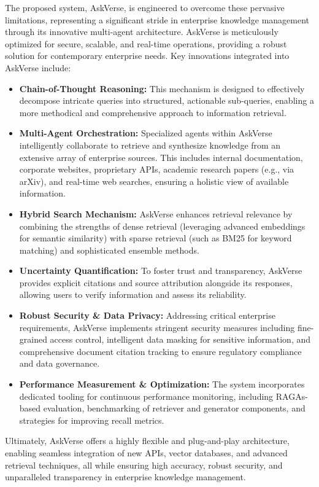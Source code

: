 \documentclass[default]{sn-jnl}%
\begin{document}
The proposed system, AskVerse, is engineered to overcome these pervasive limitations, representing a significant stride in enterprise knowledge management through its innovative multi-agent architecture. AskVerse is meticulously optimized for secure, scalable, and real-time operations, providing a robust solution for contemporary enterprise needs. Key innovations integrated into AskVerse include:
\begin{itemize}
    \item \textbf{Chain-of-Thought Reasoning:} This mechanism is designed to effectively decompose intricate queries into structured, actionable sub-queries, enabling a more methodical and comprehensive approach to information retrieval.
    \item \textbf{Multi-Agent Orchestration:} Specialized agents within AskVerse intelligently collaborate to retrieve and synthesize knowledge from an extensive array of enterprise sources. This includes internal documentation, corporate websites, proprietary APIs, academic research papers (e.g., via arXiv), and real-time web searches, ensuring a holistic view of available information.
    \item \textbf{Hybrid Search Mechanism:} AskVerse enhances retrieval relevance by combining the strengths of dense retrieval (leveraging advanced embeddings for semantic similarity) with sparse retrieval (such as BM25 for keyword matching) and sophisticated ensemble methods.
    \item \textbf{Uncertainty Quantification:} To foster trust and transparency, AskVerse provides explicit citations and source attribution alongside its responses, allowing users to verify information and assess its reliability.
    \item \textbf{Robust Security \& Data Privacy:} Addressing critical enterprise requirements, AskVerse implements stringent security measures including fine-grained access control, intelligent data masking for sensitive information, and comprehensive document citation tracking to ensure regulatory compliance and data governance.
    \item \textbf{Performance Measurement \& Optimization:} The system incorporates dedicated tooling for continuous performance monitoring, including RAGAs-based evaluation, benchmarking of retriever and generator components, and strategies for improving recall metrics.
\end{itemize}

Ultimately, AskVerse offers a highly flexible and plug-and-play architecture, enabling seamless integration of new APIs, vector databases, and advanced retrieval techniques, all while ensuring high accuracy, robust security, and unparalleled transparency in enterprise knowledge management.
\end{document}

